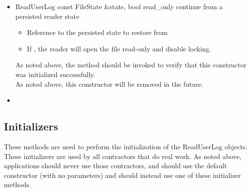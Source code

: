 \begin{itemize}
\item \Constructor
  {ReadUserLog}
  {const FileState \&state, bool read\_only}
  {continue from a persisted reader state}
  \begin{itemize}
  \item {}
    Reference to the persisted state to restore from
  \item {}
    If , the reader will open the file read-only and
    disable locking.
  \end{itemize}
  \Note As noted above, the 
  method should be invoked to verify that this constructor was
  initialized successfully.
  \\ \Note As noted above, this constructor will be removed in the future.

\item {}

\end{itemize}


\subsection{Initializers}
These methods are used to perform the initialization of the
ReadUserLog objects.  These initializers are used by all contractors
that do real work.  As noted above, applications should never use
those contractors, and should use the default constructor (with no
parameters) and should instead use one of these initializer methods.

